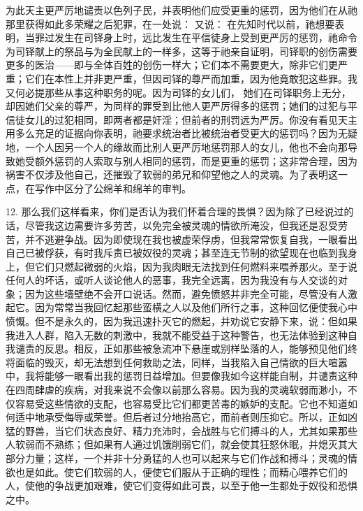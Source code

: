 为此天主更严厉地谴责以色列子民，并表明他们应受更重的惩罚，因为他们在从祂那里获得如此多荣耀之后犯罪，在一处说： 又说： 在先知时代以前，祂想要表明，当罪过发生在司铎身上时，远比发生在平信徒身上受到更严厉的惩罚，祂命令为司铎献上的祭品与为全民献上的一样多，这等于祂亲自证明，司铎职的创伤需要更多的医治——即与全体百姓的创伤一样大；它们本不需要更大，除非它们更严重；它们在本性上并非更严重，但因司铎的尊严而加重，因为他竟敢犯这些罪。我又何必提那些从事这种职务的呢。因为司铎的女儿们， 她们在司铎职务上无分，却因她们父亲的尊严，为同样的罪受到比他人更严厉得多的惩罚；她们的过犯与平信徒女儿的过犯相同，即两者都是奸淫；但前者的刑罚远为严厉。你没有看见天主用多么充足的证据向你表明，祂要求统治者比被统治者受更大的惩罚吗？因为无疑地，一个人因另一个人的缘故而比别人更严厉地惩罚那人的女儿，他也不会向那导致她受额外惩罚的人索取与别人相同的惩罚，而是更重的惩罚；这非常合理，因为祸害不仅涉及他自己，还摧毁了软弱的弟兄和仰望他之人的灵魂。为了表明这一点，在写作中区分了公绵羊和绵羊的审判。\par

12. 那么我们这样看来，你们是否认为我们怀着合理的畏惧？因为除了已经说过的话，尽管我这边需要许多劳苦，以免完全被灵魂的情欲所淹没，但我还是忍受劳苦，并不逃避争战。因为即使现在我也被虚荣俘虏，但我常常恢复自我，一眼看出自己已被俘获，有时我斥责已被奴役的灵魂；甚至连无节制的欲望现在也临到我身上，但它们只燃起微弱的火焰，因为我肉眼无法找到任何燃料来喂养那火。至于说任何人的坏话，或听人谈论他人的恶事，我完全远离，因为我没有与人交谈的对象；因为这些墙壁绝不会开口说话。然而，避免愤怒并非完全可能，尽管没有人激起它。因为常常当我回忆起那些蛮横之人以及他们所行之事，这种回忆便使我心中愤慨。但不是永久的，因为我迅速扑灭它的燃起，并劝说它安静下来，说：但如果我进入人群，陷入无数的刺激中，我就不能受益于这种警告，也无法体验到这种自我谴责的反思。相反，正如那些被急流冲下悬崖或别样坠落的人，能够预见他们终将面临的毁灭，却无法想到任何救助之法，同样，当我陷入自己情欲的巨大喧嚣中，我将能够一眼看出我的惩罚日益增加。但要像我如今这样能自制，并谴责这种在四周肆虐的疾病，对我来说不会像以前那么容易。因为我的灵魂软弱而渺小，不仅容易受这些情欲的支配，也容易受比它们都更苦毒的嫉妒的支配。它也不知道如何适中地承受侮辱或荣誉。但后者过分地抬高它，而前者则压抑它。所以，正如凶猛的野兽，当它们状态良好、精力充沛时，会战胜与它们搏斗的人，尤其如果那些人软弱而不熟练；但如果有人通过饥饿削弱它们，就会使其狂怒休眠，并熄灭其大部分力量；这样，一个并非十分勇猛的人也可以起来与它们作战和搏斗；灵魂的情欲也是如此。使它们软弱的人，便使它们服从于正确的理性；而精心喂养它们的人，使他的争战更加艰难，使它们变得如此可畏，以至于他一生都处于奴役和恐惧之中。\par

